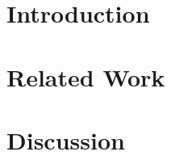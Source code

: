 \documentclass[sigconf,screen,review]{acmart}
\begin{document}
\section{Introduction}

\section{Related Work}

\section{Discussion}




\balance


\end{document}
